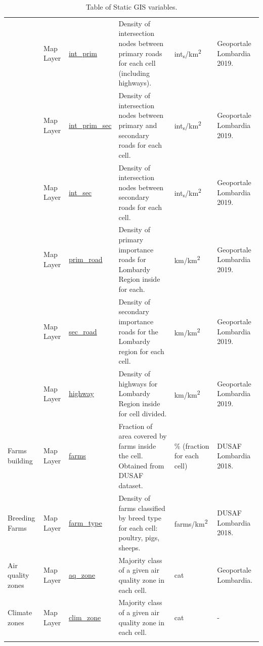 \begin{center}
\begin{longtable}{ |p{2.1cm}|p{1.5cm}|p{2.3cm}|p{4cm}|p{1.5cm}|p{2cm}| }
\hline
\pagebreak
\hline
\multirow{6}{4em}{Road Infrastructures} & Map Layer  & \underline{int\_prim} & Density of intersection nodes between primary roads for each cell (including highways). & int\textsubscript{s}/km\textsuperscript{2} & Geoportale Lombardia 2019.\\ 
& Map Layer  & \underline{int\_prim\_sec} & Density of intersection nodes between primary and secondary roads for each cell. & int\textsubscript{s}/km\textsuperscript{2} & Geoportale Lombardia 2019.\\ 
& Map Layer  & \underline{int\_sec} & Density of intersection nodes between secondary roads for each cell. & int\textsubscript{s}/km\textsuperscript{2} & Geoportale Lombardia 2019.\\ 
& Map Layer  & \underline{prim\_road} & Density of primary importance roads for Lombardy Region inside for each. & km/km\textsuperscript{2} & Geoportale Lombardia 2019.\\ 
& Map Layer  & \underline{sec\_road} & Density of secondary importance roads for the Lombardy region for each cell. & km/km\textsuperscript{2} & Geoportale Lombardia 2019.\\ 
& Map Layer  & \underline{highway} & Density of highways for Lombardy Region inside for cell divided. & km/km\textsuperscript{2} & Geoportale Lombardia 2019.\\ 
\hline

\multirow{1}{4em}{Farms building} & Map Layer  & \underline{farms} & Fraction of area covered by farms inside the cell. Obtained from DUSAF dataset. & \% (fraction for each cell) & DUSAF Lombardia 2018.\\ \hline
\multirow{1}{4em}{Breeding Farms} & Map Layer  & \underline{farm\_type} & Density of farms classified by breed type for each cell: poultry, pigs, sheeps. & farms/km\textsuperscript{2} & DUSAF Lombardia 2018.\\ \hline
\multirow{1}{4em}{Air quality zones} & Map Layer  & \underline{aq\_zone} & Majority class of a given air quality zone in each cell. & cat  & Geoportale Lombardia.\\ \hline
\multirow{1}{4em}{Climate zones} & Map Layer  & \underline{clim\_zone} & Majority class of a given air quality zone in each cell. & cat  & - \\ \hline


\hline
\caption{Table of Static GIS variables.}

\end{longtable}
\end{center}
\pagebreak

